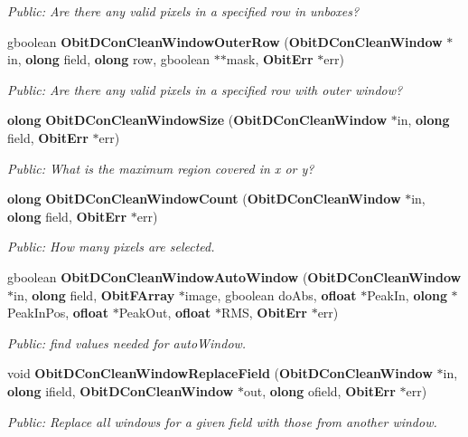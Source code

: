 \begin{CompactItemize}
\begin{CompactList}\small\item\em Public: Are there any valid pixels in a specified row in unboxes? \item\end{CompactList}\item 
gboolean {\bf Obit\-DCon\-Clean\-Window\-Outer\-Row} ({\bf Obit\-DCon\-Clean\-Window} $\ast$in, {\bf olong} field, {\bf olong} row, gboolean $\ast$$\ast$mask, {\bf Obit\-Err} $\ast$err)
\begin{CompactList}\small\item\em Public: Are there any valid pixels in a specified row with outer window? \item\end{CompactList}\item 
{\bf olong} {\bf Obit\-DCon\-Clean\-Window\-Size} ({\bf Obit\-DCon\-Clean\-Window} $\ast$in, {\bf olong} field, {\bf Obit\-Err} $\ast$err)
\begin{CompactList}\small\item\em Public: What is the maximum region covered in x or y? \item\end{CompactList}\item 
{\bf olong} {\bf Obit\-DCon\-Clean\-Window\-Count} ({\bf Obit\-DCon\-Clean\-Window} $\ast$in, {\bf olong} field, {\bf Obit\-Err} $\ast$err)
\begin{CompactList}\small\item\em Public: How many pixels are selected. \item\end{CompactList}\item 
gboolean {\bf Obit\-DCon\-Clean\-Window\-Auto\-Window} ({\bf Obit\-DCon\-Clean\-Window} $\ast$in, {\bf olong} field, {\bf Obit\-FArray} $\ast$image, gboolean do\-Abs, {\bf ofloat} $\ast$Peak\-In, {\bf olong} $\ast$Peak\-In\-Pos, {\bf ofloat} $\ast$Peak\-Out, {\bf ofloat} $\ast$RMS, {\bf Obit\-Err} $\ast$err)
\begin{CompactList}\small\item\em Public: find values needed for auto\-Window. \item\end{CompactList}\item 
void {\bf Obit\-DCon\-Clean\-Window\-Replace\-Field} ({\bf Obit\-DCon\-Clean\-Window} $\ast$in, {\bf olong} ifield, {\bf Obit\-DCon\-Clean\-Window} $\ast$out, {\bf olong} ofield, {\bf Obit\-Err} $\ast$err)
\begin{CompactList}\small\item\em Public: Replace all windows for a given field with those from another window. \item\end{CompactList}\item 
$$
\end{CompactItemize}
